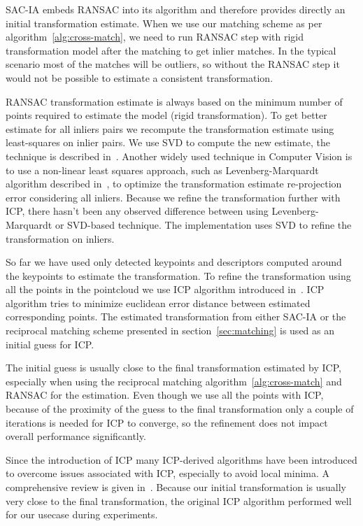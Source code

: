 \gls{SAC-IA} embeds \gls{RANSAC} into its algorithm and therefore provides directly an initial transformation estimate. When we use our matching scheme as per algorithm~\ref{alg:cross-match}, we need to run \gls{RANSAC} step with rigid transformation model after the matching to get inlier matches. In the typical scenario most of the matches will be outliers, so without the \gls{RANSAC} step it would not be possible to estimate a consistent transformation.

\gls{RANSAC} transformation estimate is always based on the minimum number of points required to estimate the model (rigid transformation). To get better estimate for all inliers pairs we recompute the transformation estimate using least-squares on inlier pairs. We use \gls{SVD} to compute the new estimate, the technique is described in~\citet{golub1970svd}. Another widely used technique in Computer Vision is to use a non-linear least squares approach, such as Levenberg-Marquardt algorithm described in~\citet{more1978levmarq}, to optimize the transformation estimate re-projection error considering all inliers. Because we refine the transformation further with \gls{ICP}, there hasn't been any observed difference between using Levenberg-Marquardt or \gls{SVD}-based technique. The implementation uses \gls{SVD} to refine the transformation on inliers.

So far we have used only detected keypoints and descriptors computed around the keypoints to estimate the transformation. To refine the transformation using all the points in the pointcloud we use \gls{ICP} algorithm introduced in~\citet{besl1992icp}. \gls{ICP} algorithm tries to minimize euclidean error distance between estimated corresponding points. The estimated transformation from either \gls{SAC-IA} or the reciprocal matching scheme presented in section~\ref{sec:matching} is used as an initial guess for \gls{ICP}.

The initial guess is usually close to the final transformation estimated by \gls{ICP}, especially when using the reciprocal matching algorithm~\ref{alg:cross-match} and \gls{RANSAC} for the estimation. Even though we use all the points with \gls{ICP}, because of the proximity of the guess to the final transformation only a couple of iterations is needed for \gls{ICP} to converge, so the refinement does not impact overall performance significantly.

Since the introduction of \gls{ICP} many \gls{ICP}-derived algorithms have been introduced to overcome issues associated with \gls{ICP}, especially to avoid local minima. A comprehensive review is given in~\citet{pomerleau2015reviewregistration}. Because our initial transformation is usually very close to the final transformation, the original \gls{ICP} algorithm performed well for our usecase during experiments.

